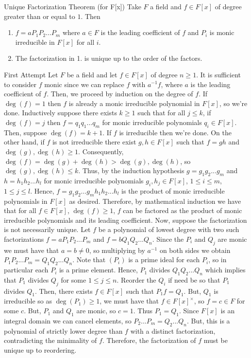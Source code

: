 \documentclass[12pt, a4paper, twoside, openright, titlepage]{book}
\begin{document}
\begin{namthm}{Unique Factorization Theorem (for F[x])}{}
    Take $F$ a field and $f \in F[x]$ of degree greater than or equal to $1$. Then \begin{enumerate}
        \item $f = aP_1P_2...P_m$ where $a \in F$ is the leading coefficient of $f$ and $P_i$ is monic irreducible in $F[x]$ for all $i$.
        \item The factorization in 1. is unique up to the order of the factors.
    \end{enumerate}
\end{namthm}
\begin{proof*}{First Attempt}
    Let $F$ be a field and let $f \in F[x]$ of degree $n \geq 1$. It is sufficient to consider $f$ monic since we can replace $f$ with $a^{-1}f$, where $a$ is the leading coefficient of $f$. Then, we proceed by induction on the degree of $f$. If $\deg(f) = 1$ then $f$ is already a monic irreducible polynomial in $F[x]$, so we're done. Inductively suppose there exists $k \geq 1$ such that for all $j \leq k$, if $\deg(f) = j$ then $f = q_1q_1...q_m$ for monic irreducible polynomials $q_i \in F[x]$. Then, suppose $\deg(f) = k+1$. If $f$ is irreducible then we're done. On the other hand, if $f$ is not irreducible there exist $g,h \in F[x]$ such that $f = gh$ and $\deg(g),\deg(h) \geq 1$. Consequently, $\deg(f) = \deg(g)+\deg(h) > \deg(g),\deg(h)$, so $\deg(g),\deg(h) \leq k$. Thus, by the induction hypothesis $g = g_1g_2...g_m$ and $h = h_1h_2...h_l$ for monic irreducible polynomials $g_i,h_j \in F[x]$, $1\leq i \leq m$, $1 \leq j \leq l$. Hence, $f = g_1g_2...g_mh_1h_2...h_l$ is the product of monic irreducible polynomials in $F[x]$ as desired. Therefore, by mathematical induction we have that for all $f \in F[x]$, $\deg(f) \geq 1$, $f$ can be factored as the product of monic irreducible polynomials and its leading coefficient. Now, suppose the factorization is not necessarily unique. Let $f$ be a polynomial of lowest degree with two such factorizations $f = aP_1P_2...P_m$ and $f = bQ_1Q_2...Q_n$. Since the $P_i$ and $Q_j$ are monic we must have that $a = b \neq 0$, so multiplying by $a^{-1}$ on both sides we obtain $P_1P_2...P_m = Q_1Q_2...Q_n$. Note that $(P_i)$ is a prime ideal for each $P_i$, so in particular each $P_i$ is a prime element. Hence, $P_1$ divides $Q_1Q_2...Q_n$ which implies that $P_1$ divides $Q_j$ for some $1 \leq j \leq n$. Reorder the $Q_i$ if need be so that $P_1$ divides $Q_1$. Then, there exists $f \in F[x]$ such that $P_1f = Q_1$. But, $Q_1$ is irreducible so as $\deg(P_1) \geq 1$, we must have that $f \in F[x]^{\times}$, so $f = c \in F$ for some $c$. But, $P_1$ and $Q_1$ are monic, so $c = 1$. Thus $P_1 = Q_1$. Since $F[x]$ is an integral domain we can cancel elements, so $P_2...P_m = Q_2...Q_n$. But, this is a polynomial of strictly lower degree than $f$ with a distinct factorization, contradicting the minimality of $f$. Therefore, the factorization of $f$ must be unique up to reordering.
\end{proof*}
\end{document}
